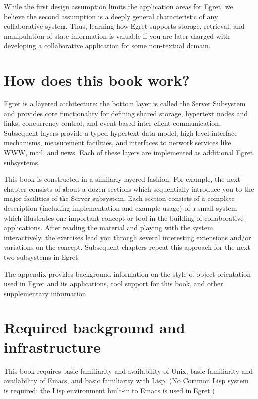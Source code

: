 While the first design assumption limits the application areas for Egret,
we believe the second assumption is a deeply general characteristic of
any collaborative system.  Thus, learning how Egret supports storage,
retrieval, and manipulation of state information is valuable if you are
later charged with developing a collaborative application for some
non-textual domain. 


\section{How does this book work?}

Egret is a layered architecture: the bottom layer is called the Server
Subsystem and provides core functionality for defining shared storage,
hypertext nodes and links, concurrency control, and event-based
inter-client communication.  Subsequent layers provide a typed hypertext
data model, high-level interface mechanisms, measurement facilities, and
interfaces to network services like WWW, mail, and news.  Each of these
layers are implemented as additional Egret subsystems.

This book is constructed in a similarly layered fashion.  For example, the
next chapter consists of about a dozen sections which sequentially
introduce you to the major facilities of the Server subsystem.  Each
section consists of a complete description (including implementation and
example usage) of a small system which illustrates one important concept or
tool in the building of collaborative applications.  After reading the
material and playing with the system interactively, the exercises lead you
through several interesting extensions and/or variations on the concept.
Subsequent chapters repeat this approach for the next two subsystems in
Egret.  

The appendix provides background information on the style of object orientation
used in Egret and its applications, tool support for this book, and other
supplementary information.

\section{Required background and infrastructure}

This book requires basic familiarity and availability of Unix, basic
familiarity and availability of Emacs, and basic familiarity with Lisp. (No
Common Lisp system is required: the Lisp environment built-in to Emacs is
used in Egret.)

